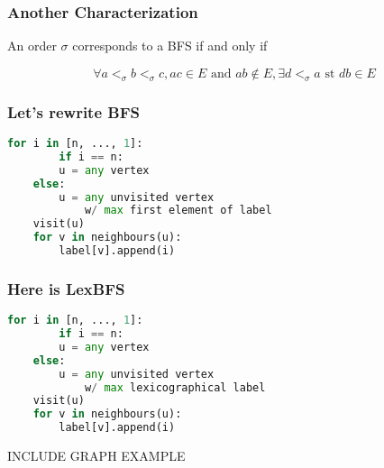 \documentclass{beamer}
\begin{document}
\begin{frame}\frametitle{Another Characterization}
    \begin{theorem}
        An order $\sigma$ corresponds to a BFS if and only if
	    
	    $$\forall a <_{\sigma} b <_{\sigma} c, ac \in E\text{ and }ab \notin E, \exists d <_{\sigma} a\text{ st }db \in E$$
    \end{theorem}

    \begin{center}
    \end{center}

\end{frame}

\begin{frame}[fragile]\frametitle{Let's rewrite BFS}
    \begin{lstlisting}[language = Python]
    for i in [n, ..., 1]:
        if i == n:
	    u = any vertex
	else:
	    u = any unvisited vertex
	        w/ max first element of label
	visit(u)
	for v in neighbours(u):
	    label[v].append(i)
    \end{lstlisting}
\end{frame}

\begin{frame}[fragile]\frametitle{Here is LexBFS}
    \begin{lstlisting}[language = Python]
    for i in [n, ..., 1]:
        if i == n:
	    u = any vertex
	else:
	    u = any unvisited vertex
	        w/ max lexicographical label
	visit(u)
	for v in neighbours(u):
	    label[v].append(i)
    \end{lstlisting}

	
    INCLUDE GRAPH EXAMPLE
\end{frame}
\end{document}
